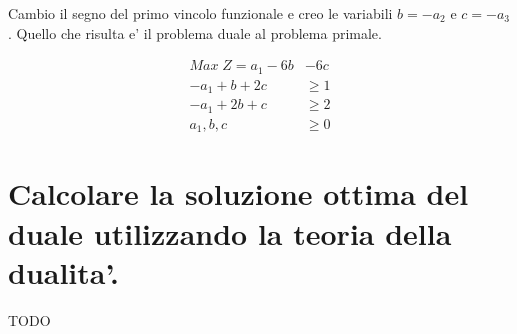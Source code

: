 \documentclass[a4paper,12pt,oneside]{article}
\begin{document}
    Cambio il segno del primo vincolo funzionale e creo le variabili $b = -a_2$ e $c = -a_3$.
    Quello che risulta e' il problema duale al problema primale.

    \begin{align*}
        Max \; Z = a_1 - 6 b &- 6 c \\
        - a_1 + b + 2 c &\geq 1 \\
        - a_1 + 2 b + c &\geq 2 \\
        a_1, b, c &\geq 0
    \end{align*}

    \section{Calcolare la soluzione ottima del duale utilizzando la teoria della dualita'.}
    
    TODO
\end{document}
